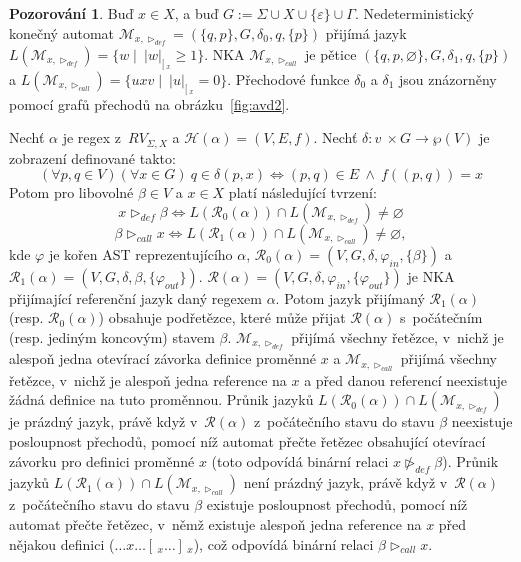 \documentclass[thesis=B,czech]{FITthesis}[2019/12/23]
\theoremstyle{definition}
\newtheorem{pozorovani}{Pozorování}[chapter]
\begin{document}
\begin{pozorovani}\label{obs:avd} Buď $x \in X$, a buď $G:=\Sigma\cup X\cup\{\varepsilon\}\cup\Gamma$. Nedeterministický konečný automat $\mathcal{M}_{x, \triangleright_{def}} = (\{q, p\}, G, \delta_0, q, \{p\})$ přijímá jazyk $L(\mathcal{M}_{x, \triangleright_{def}})={\{w \mid \ |w|_{[\,_x}\ge1\}}$. NKA $\mathcal{M}_{x, \triangleright_{call}}$ je pětice $(\{q, p, \varnothing\}, G, \delta_1, q, \{p\})$ a $L(\mathcal{M}_{x, \triangleright_{call}})= \{uxv \mid \ |u|_{[\,_x}=0\}$. Přechodové funkce $\delta_0$ a $\delta_1$ jsou znázorněny pomocí grafů přechodů na obrázku~\ref{fig:avd2}. 

Nechť $\alpha$ je regex z~$RV_{\Sigma, X}$ a $\mathcal{H}(\alpha)=(V,E,f)$. Nechť $\delta : v~\times G \rightarrow \wp(V)$ je zobrazení definované takto:
\begin{equation*}(\forall p, q \in V) (\forall x \in G) \ q \in \delta(p, x) \iff (p, q) \in E \ \wedge \ f((p,q))=x
\end{equation*}
Potom pro libovolné $\beta \in V$ a $x\in X$ platí následující tvrzení:
\begin{equation*} x \triangleright_{def} \beta \iff L(\mathcal{R}_0(\alpha))\cap L(\mathcal{M}_{x, \triangleright_{def}}) \ne \varnothing \end{equation*} \begin{equation*} \beta \triangleright_{call} x \iff L(\mathcal{R}_1(\alpha))\cap L(\mathcal{M}_{x, \triangleright_{call}}) \ne \varnothing, \end{equation*}
kde $\varphi$ je kořen AST reprezentujícího $\alpha$, $\mathcal{R}_0(\alpha)=(V, G, \delta, \varphi_{in}, \{\beta\})$ a $\mathcal{R}_1(\alpha)=(V, G, \delta, \beta, \{\varphi_{out}\})$.
$\mathcal{R}(\alpha) = (V, G, \delta, \varphi_{in}, \{\varphi_{out}\})$ je NKA přijímající referenční jazyk daný regexem $\alpha$. Potom jazyk přijímaný $\mathcal{R}_1(\alpha)$ (resp. $\mathcal{R}_0(\alpha)$) obsahuje podřetězce, které může přijat $\mathcal{R}(\alpha)$ s~počátečním (resp. jediným koncovým) stavem $\beta$. $\mathcal{M}_{x, \triangleright_{def}}$ přijímá všechny řetězce, v~nichž je alespoň jedna otevírací závorka definice proměnné $x$ a $\mathcal{M}_{x, \triangleright_{call}}$ přijímá všechny řetězce, v~nichž je alespoň jedna reference na $x$ a před danou referencí neexistuje žádná definice na tuto proměnnou. Průnik jazyků $L(\mathcal{R}_0(\alpha))\cap L(\mathcal{M}_{x, \triangleright_{def}})$ je prázdný jazyk, právě když v~$\mathcal{R}(\alpha)$ z~počátečního stavu do stavu $\beta$ neexistuje posloupnost přechodů, pomocí níž automat přečte řetězec obsahující otevírací závorku pro definici proměnné $x$ (toto odpovídá binární relaci $x \ntriangleright_{def} \beta$). Průnik jazyků $L(\mathcal{R}_1(\alpha))\cap L(\mathcal{M}_{x, \triangleright_{call}})$ není prázdný jazyk, právě když v~$\mathcal{R}(\alpha)$ z~počátečního stavu do stavu $\beta$ existuje posloupnost přechodů, pomocí níž automat přečte řetězec, v~němž existuje alespoň jedna reference na $x$ před nějakou definici ($\dots x \dots [\,_x \dots ]\,_x$), což odpovídá binární relaci $\beta \triangleright_{call} x$. \cite{schmidref}
\end{pozorovani}
\end{document}
